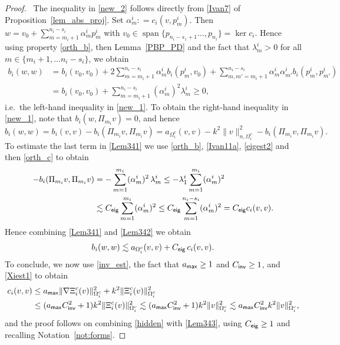 \documentclass[numbers,webpdf,imaiai]{ima-authoring-template}%
\theoremstyle{thmstyletwo}%
\numberwithin{equation}{section}
\newcommand{\Ceig}{C_{\textup{\textsf{eig}}}} %
\newcommand{\Cinv}{C_{\textup{\textsf{inv}}}}
\newcommand{\Cinvt}{C^2_{\textup{\textsf{inv}}}}
\newcommand{\assign}{\mathrel{\mathop:}=}
\numberwithin{equation}{section}
\DeclareMathOperator{\linspan}{span}
\newcommand{\amax}{a_{\textup{\textsf{max}}}}
\begin{document}
{\begin{proof}\, 
The inequality in \eqref{new_2} follows directly from \eqref{Ivan7} of Proposition~\ref{lem_abs_proj}.
Set $\alpha_m^i \assign c_{i}(v,p_m^i)$.
Then $w = v_0 + \sum_{m = m_i+1}^{n_i-s_i} \alpha_m^i p_m^i$ 
with $v_0 \in \linspan\{ p_{n_i-s_1+1}\ldots , p_{n_i}\} = \ker c_i$.  Hence using property \eqref{orth_b},
then Lemma~\ref{PBP_PD} and the fact that $\lambda_m^i > 0$ for all $m \in \{m_i +1, \ldots n_i-s_i\}$, we obtain  
\begin{align*}
	b_{i} (w,w) &= b_{i} (v_0,v_0) + 2 \sum_{m= m_i+1}^{n_i-s_i} \alpha_m^i b_{i} (p_m^i,v_0) 
	+ \sum_{m,m'= m_i+1}^{n_i-s_i} \alpha_m^i \alpha_{m'}^i  b_{i} (p_m^i,p_{m'}^i)
	\\
	&= b_{i} (v_0,v_0) +  \sum_{m = m_i+1}^{n_i-s_i} (\alpha_m^i)^2 \lambda_m^i 
	\ge  0,
\end{align*}   
i.e.\ the left-hand inequality in \eqref{new_1}. 
To obtain the {right-hand}  inequality in \eqref{new_1}, note that $b_{i}(w,\Pi_{m_i}v) = 0$, and hence 
\begin{equation}\label{Lem341}
	b_{i}\!\left( w , w \right)  =  b_{i}(v,v)  - b_{i}( \Pi_{m_i}  v,\Pi_{m_i}  v) 
	= a_{\Omega_i^c}(v,v) - k^2 \|v\|_{n,\Omega_i^c}^2 - b_{i}( \Pi_{m_i}  v, \Pi_{m_i}  v). 
\end{equation}
To estimate the last term in \eqref{Lem341} we use \eqref{orth_b}, \eqref{Ivan11a},   
\eqref{eigest2} and then \eqref{orth_c} to obtain     
\begin{align}
	-b_{i}\!\left( \Pi_{m_i} v, \Pi_{m_i} v \right) 
	&= -  \sum_{m=1}^{m_i} (\alpha_m^i)^2 \, \lambda_m^i 
	\le -\lambda_1^i \sum_{m=1}^{m_i}(\alpha_m^i)^2
	\nonumber\\
	&\lesssim \Ceig \sum_{m=1}^{m_i} (\alpha_m^i)^2
	\le \Ceig\sum_{m=1}^{n_i-s_i} (\alpha_m^i)^2 
	= \Ceig c_{i}(v,v). 
	\label{Lem342}
\end{align}
Hence combining \eqref{Lem341} and \eqref{Lem342} we obtain 
\begin{equation}
\label{Lem343}
	b_i(w,w) \lesssim a_{\Omega_i^c}(v,v) + \Ceig\, c_i(v,v).
\end{equation}
To conclude, we now use \eqref{inv_est}, the fact that $\amax \ge 1$ and $\Cinv\ge 1$,
and \eqref{Xiest1} to obtain
\begin{align}
	c_i(v,v)  &\le \amax \|\nabla \Xi_i^c(v)\|_{\Omega_i^c}^2 + k^2 \|\Xi_i^c(v)\|_{\Omega_i^c}^2
	\nonumber\\
	&\le (\amax\Cinvt + 1)k^2 \Vert \Xi_i^c(v)\Vert_{\Omega_i^c}^2 
	\lesssim (\amax  \Cinvt    + 1 ) k^2\Vert v \Vert_{\Omega_i^c}^2 \lesssim \amax \Cinvt k^2  \Vert v \Vert_{\Omega_i^c}^2,  \label{hidden}
\end{align}
and the proof follows on combining \eqref{hidden} with \eqref{Lem343}, using $\Ceig\ge1$ and recalling Notation~\ref{not:forms}.
\end{proof}
 
}
\end{document}
